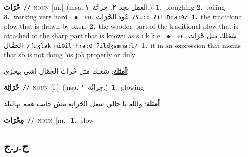 \documentclass[10pt,a4paper,twoside]{article} %
\begin{document}
\begin{multicols}{2}
{\setlength\topsep{0pt}\textbf{\foreignlanguage{arabic}{حْرَاث}}\ {\color{gray}\texttt{//}\color{black}}\ \textsc{noun}\ [m.]\ \color{gray}(msa. \foreignlanguage{arabic}{العمل بجد}~\foreignlanguage{arabic}{\textbf{٢.}}  \foreignlanguage{arabic}{حِراثَة}~\foreignlanguage{arabic}{\textbf{١.}})\color{black}\ \textbf{1.}~ploughing  \textbf{2.}~toiling  \textbf{3.}~working very hard\ \ $\bullet$\ \ \textsc{ph.} \color{gray} \foreignlanguage{arabic}{عُود الحْرَاث}\color{black}\ {\color{gray}\texttt{/{\sffamily ʕuːd ʔiliħraːθ}/}\color{black}}\ \textbf{1.}~the traditional plow that is drawn by oxen.  \textbf{2.}~the wooden part of the traditional plow that is attached to the sharp part that is known as s i k k e\ \ $\bullet$\ \ \textsc{ph.} \color{gray} \foreignlanguage{arabic}{شغلك مثل حْرَاث الجمَّال}\color{black}\ {\color{gray}\texttt{/{\sffamily ʃuɣlak miθil ħraːθ ʔildʒammaːl}/}\color{black}}\ \textbf{1.}~it in an expression that means that sb is not doing his job properly or duly\  \begin{flushright}\color{gray}\foreignlanguage{arabic}{\textbf{\underline{\foreignlanguage{arabic}{أمثلة}}}: شغلك مثل حْراث الجمّال اشي بيخزي!}\end{flushright}\color{black}} \vspace{2mm}

{\setlength\topsep{0pt}\textbf{\foreignlanguage{arabic}{حْرَاثِة}}\ {\color{gray}\texttt{//}\color{black}}\ \textsc{noun}\ [f.]\ \color{gray}(msa. \foreignlanguage{arabic}{حِراثَة}~\foreignlanguage{arabic}{\textbf{١.}})\color{black}\ \textbf{1.}~plowing\  \begin{flushright}\color{gray}\foreignlanguage{arabic}{\textbf{\underline{\foreignlanguage{arabic}{أمثلة}}}: والله يا خالي شغل الحْراثِة مش جايب همه بهالبلد}\end{flushright}\color{black}} \vspace{2mm}

{\setlength\topsep{0pt}\textbf{\foreignlanguage{arabic}{مِحْرَاث}}\ {\color{gray}\texttt{//}\color{black}}\ \textsc{noun}\ [m.]\ \textbf{1.}~plow\ } \vspace{2mm}

\vspace{-3mm}
\subsection*{\color{blue}\foreignlanguage{arabic}{ح.ر.ج}\color{blue}{}} 


\end{multicols}
\end{document}
